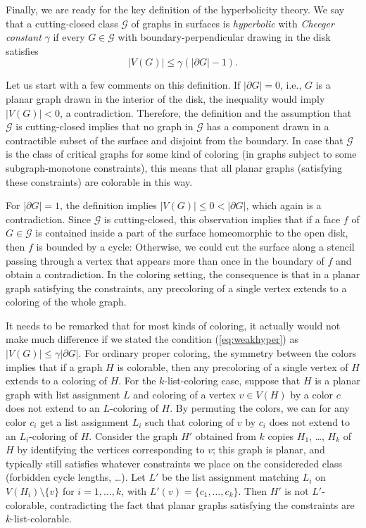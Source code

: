 \documentclass[12pt,twoside,openright,a4paper]{book}
\newcommand{\GG}{\mathcal{G}}
\begin{document}
Finally, we are ready for the key definition of the hyperbolicity theory.
We say that a cutting-closed class $\GG$ of graphs in surfaces is \emph{hyperbolic} with \emph{Cheeger constant} $\gamma$
if every $G\in\GG$ with boundary-perpendicular drawing in the disk satisfies
\begin{equation}\label{eq:weakhyper}
|V(G)|\le \gamma(|\partial G|-1).
\end{equation}

Let us start with a few comments on this definition.  If $|\partial G|=0$, i.e., $G$ is a planar graph drawn in the interior
of the disk, the inequality would imply $|V(G)|<0$, a contradiction.  Therefore, the definition and the assumption that
$\GG$ is cutting-closed implies that no graph in $\GG$ has a component drawn in a contractible subset of the surface and disjoint
from the boundary.  In case that $\GG$ is the class of critical graphs for some kind of coloring (in graphs subject to some
subgraph-monotone constraints), this means that all planar graphs (satisfying these constraints) are colorable in this way.

For $|\partial G|=1$, the definition implies $|V(G)|\le 0<|\partial G|$, which again is a contradiction.
Since $\GG$ is cutting-closed, this observation implies that if a face $f$ of $G\in\GG$ is contained inside a part of the surface
homeomorphic to the open disk, then $f$ is bounded by a cycle: Otherwise, we could cut the surface along a stencil
passing through a vertex that appears more than once in the boundary of $f$ and obtain a contradiction.
In the coloring setting, the consequence is that in a planar graph satisfying the constraints, any precoloring of a single
vertex extends to a coloring of the whole graph.

It needs to be remarked that for most kinds of coloring, it actually would not make much difference if
we stated the condition (\ref{eq:weakhyper}) as $|V(G)|\le \gamma|\partial G|$.  For ordinary proper coloring, the symmetry between the colors
implies that if a graph $H$ is colorable, then any precoloring of a single vertex of $H$ extends to a coloring of $H$.
For the $k$-list-coloring case, suppose that $H$ is a planar graph with list assignment $L$ and coloring of a vertex $v\in V(H)$
by a color $c$ does not extend to an $L$-coloring of $H$.  By permuting the colors, we can for any color $c_i$ get a list assignment $L_i$
such that coloring of $v$ by $c_i$ does not extend to an $L_i$-coloring of $H$.  Consider the graph $H'$ obtained from
$k$ copies $H_1$, \ldots, $H_k$ of $H$ by identifying the vertices corresponding to $v$; this graph is planar, and typically
still satisfies whatever constraints we place on the considereded class (forbidden cycle lengths, \ldots).
Let $L'$ be the list assignment matching $L_i$ on $V(H_i)\setminus \{v\}$ for $i=1,\ldots, k$, with $L'(v)=\{c_1,\ldots, c_k\}$.
Then $H'$ is not $L'$-colorable, contradicting the fact that planar graphs satisfying the constraints are $k$-list-colorable.
\end{document}
